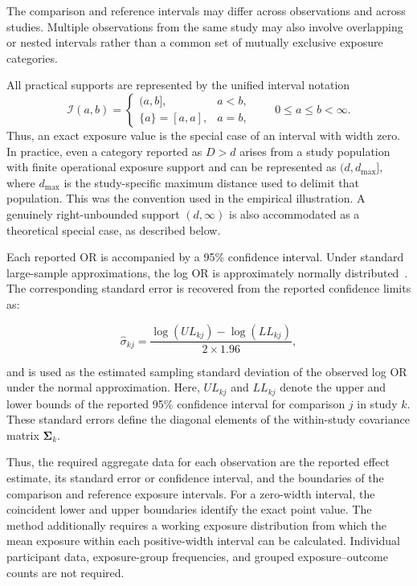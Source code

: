 \documentclass[journal=rsm]{CUP-JNL-DTM}%
\theoremstyle{definition}
\numberwithin{equation}{section}
\begin{document}
The comparison and reference intervals may differ across observations and
across studies. Multiple observations from the same study may also involve
overlapping or nested intervals rather than a common set of mutually
exclusive exposure categories.

All practical supports are represented by the unified interval notation
\begin{equation}
  \mathcal I(a,b)=
  \begin{cases}
    (a,b], & a<b,\\
    \{a\}=[a,a], & a=b,
  \end{cases}
  \qquad 0\leq a\leq b<\infty.
  \label{eq:support_family}
\end{equation}
Thus, an exact exposure value is the special case of an interval with width
zero. In practice, even a category reported as $D>d$ arises from a study
population with finite operational exposure support and can be represented as
$(d,d_{\max}]$, where $d_{\max}$ is the study-specific maximum distance used
to delimit that population. This was the convention used in the empirical
illustration. A genuinely right-unbounded support $(d,\infty)$ is also
accommodated as a theoretical special case, as described below.
 
Each reported OR is accompanied by a 95\% confidence interval. Under standard large-sample approximations, the log OR is approximately normally distributed~\cite{Greenland1992, Orsini2012}. The corresponding standard error is recovered from the reported confidence limits as:

%

\begin{equation}
  \hat{\sigma}_{kj}
    = \frac{\log(UL_{kj}) - \log(LL_{kj})}{2 \times 1.96},
  \label{eq:se}
\end{equation}

%

and is used as the estimated sampling standard deviation of the observed log OR under the normal approximation. Here, $UL_{kj}$ and $LL_{kj}$ denote the upper and lower bounds of the reported 95\% confidence interval for comparison $j$ in study $k$. These standard errors define the diagonal elements of the within-study covariance matrix $\boldsymbol{\Sigma}_k$.

Thus, the required aggregate data for each observation are the reported
effect estimate, its standard error or confidence interval, and the
boundaries of the comparison and reference exposure intervals. For a
zero-width interval, the coincident lower and upper boundaries identify the
exact point value. The method
additionally requires a working exposure distribution from which the mean
exposure within each positive-width interval can be calculated. Individual participant
data, exposure-group frequencies, and grouped exposure--outcome counts are
not required.
\end{document}
